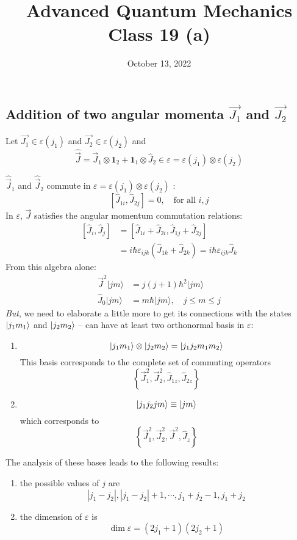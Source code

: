 \documentclass[12pt]{article}
\title{Advanced Quantum Mechanics\\Class 19 (a)}
\date{October 13, 2022}                                           %
\newcommand{\be}{\begin{equation}}
\newcommand{\ee}{\end{equation}}
\begin{document}
\maketitle


\subsection{Addition of two angular momenta \(\vec{J_{1}}\) and \(\vec{J_{2}}\)}

Let 
\(\vec{J_{1}} \in \varepsilon\left(j_{1}\right)\) and \(\vec{J_{2}} \in \varepsilon\left(j_{2}\right)\)
and
\be
\hat{\vec{J}}=\vec{J}_{1} \otimes \mathbf{1}_{2}+\mathbf{1}_{1} \otimes \hat{J}_{2} \in \varepsilon=\varepsilon\left(j_{1}\right) \otimes \varepsilon\left(j_{2}\right)
\ee

\(\hat{\vec{J}}_{1}\) and \(\hat{\vec{J}}_{2}\) commute in \(\varepsilon=\varepsilon\left(j_{1}\right) \otimes \varepsilon\left(j_{2}\right)\) :
\be
\left[\hat{J}_{1 i}, \hat{J}_{2 j}\right]=0, \quad \text{for all } i, j
\ee
In $\varepsilon$, $\vec{J}$ satisfies the angular momentum
commutation relations:
\be
\begin{aligned} 
{\left[\hat{J}_{i}, \hat{J}_j\right] } 
&=\left[\hat{J}_{1 i}+\hat{J}_{2 i}, \hat{J}_{1 j}+\hat{J}_{2 j}\right] \\ 
&=i \hbar \varepsilon_{i j k}\left(\hat{J}_{1 k}+\hat{J}_{2 k}\right)=i \hbar \varepsilon_{i j k} \hat{J}_{k} \end{aligned}
\ee
From this algebra alone:
\be
\begin{aligned}
\vec{J}^{2}|j m\rangle
&=j(j+1) \hbar^{2}|j m\rangle \\ 
\hat{J}_{0}|j m\rangle
&=m \hbar|j m\rangle,\quad j \leqslant m \leqslant j
\end{aligned}
\ee
\emph{But}, we need to elaborate a little more to get
its connections with the states $\ket{j_1m_1}$ and $\ket{j_2m_2}$ -- can have at least two orthonormal basis in $\varepsilon:$

\begin{enumerate}
\item
\be
\ket{j_1 m_1} \otimes \ket{j_2 m_2} = \ket{j_1 j_2 m_1 m_2}
\ee
This basis corresponds to the complete set of
commuting operators
\be
\left\{\vec{J}_{1}^{2}, \vec{J}_{2}^{2}, \hat{J}_{1z}, \hat{J}_{2z}\right\}
\ee
%
\item
\be
\ket{j_1 j_2 j m} \equiv \ket{jm}
\ee
which corresponds to
\be
\left\{\vec{J}_{1}^{2}, \vec{J}_{2}^{2}, \vec{J}^{2}, \hat{J}_{z}\right\}
\ee
\end{enumerate}
The analysis of these bases leads to the following results:
\begin{enumerate}
\item the possible values of $j$ are
\be
\left|j_{1}-j_{2}\right|,\left|j_{1}-j_{2}\right|+1, \cdots, j_{1}+j_{2}-1, j_{1}+j_{2}
\ee
%
\item the dimension of $\varepsilon$ is 
\be
\operatorname{dim}\varepsilon = (2j_1+1)(2j_2+1)
\ee
\end{enumerate}
\end{document}

